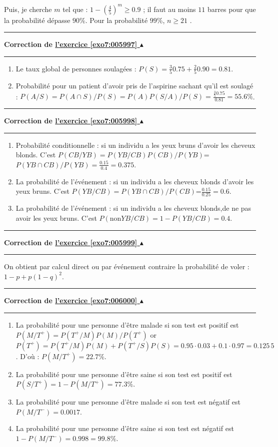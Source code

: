 \documentclass[11pt,a4paper]{article}
\newcounter{exo}
\newcommand{\correction}[1]{\hypertarget{cor7:#1}{}\label{cor7:#1}{\bf Correction de \hyperlink{exo7:#1}{l'exercice \ref{exo7:#1} $\blacktriangle$}}\vspace{1mm}\hrule\vspace{1mm}}
\newcommand{\fincorrection}{\vspace{1mm}\hrule\vspace*{7mm}}
\begin{document}
Puis, je cherche $m$ tel que : $1-(\frac{4}{5})^{m}\geq 0.9$ ; il
faut au moins $11$ barres pour que la probabilité dépasse $90$\%.
Pour la probabilité $99$\%, $n\geq 21$ .
\fincorrection
\correction{005997}
\begin{enumerate}
\item Le taux global de personnes soulagées :
$P(S)=\frac{3}{5}0.75+\frac{2}{5}0.90=0.81$.

\item Probabilité pour un patient d'avoir pris de l'aspirine sachant qu'il
est soulagé :
$P(A/S)=P(A\cap S)/P(S)=P(A)P(S/A)/P(S)=\frac{\frac{3}{5}0.75}{0.81}=55.6\%$.
\end{enumerate}
\fincorrection
\correction{005998}
\begin{enumerate}
\item Probabilité conditionnelle : si un individu a les yeux bruns d'avoir
les cheveux blonds. 
C'est $P(CB/YB)=P(YB/CB)P(CB)/P(YB)$=$P(YB\cap CB)/P(YB)=\frac{0.15}{0.4}=0.375$.

\item La probabilité de l'événement : si un individu a les cheveux
blonds d'avoir les yeux bruns.
C'est $P(YB/CB)=P(YB\cap CB)/P(CB)$=$\frac{0.15}{0.25}=0.6$.

\item La probabilité de l'événement : si un individu a les cheveux
blonds,de ne pas avoir les yeux bruns.
C'est $P(\text{non}YB/CB)=1-P(YB/CB)=0.4$.
\end{enumerate}
\fincorrection
\correction{005999}
On obtient par calcul direct ou par événement contraire
la probabilité de voler : $1-p+p(1-q)^{2}$.
\fincorrection
\correction{006000}
\begin{enumerate}
\item La probabilité pour une personne d'être malade si son test est
positif est $P(M/T^{+})=P(T^{+}/M)P(M)/P(T^{+})$
or $P(T^{+})=P(T^{+}/M)P(M)+P(T^{+}/S)P(S)=0.95\cdot 0.03+0.1\cdot
0.97=0.125\,5$. 
D'où : $P(M/T^{+})=22.7\%$.

\item La probabilité pour une personne d'être saine si son test est
positif est $P(S/T^{+})=1-P(M/T^{+})=77.3\%$.

\item La probabilité pour une personne d'être malade si son test est négatif 
est $P(M/T^{-})=0.0017$.

\item La probabilité pour une personne d'être saine si son test est négatif
est $1-P(M/T^{-})=0.998=99.8\%$.
\end{enumerate}
\end{document}
